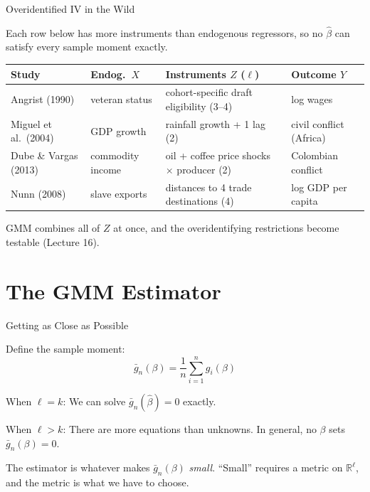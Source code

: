 \documentclass[aspectratio=169, handout, t]{beamer}
\numberwithin{equation}{section}
\begin{document}
\begin{frame}{Overidentified IV in the Wild}

Each row below has more instruments than endogenous regressors, so no $\hat\beta$ can satisfy every sample moment exactly.

\medskip
\renewcommand{\arraystretch}{1.05}
\footnotesize
\begin{tabular}{p{3.0cm}p{2.3cm}p{4.4cm}p{2.4cm}}
\toprule
\textbf{Study} & \textbf{Endog.\ $X$} & \textbf{Instruments $Z$ ($\ell$)} & \textbf{Outcome $Y$} \\
\midrule
Angrist (1990) & veteran status & cohort-specific draft eligibility (3--4) & log wages \\
Miguel et al.\ (2004) & GDP growth & rainfall growth + 1 lag (2) & civil conflict (Africa) \\
Dube \& Vargas (2013) & commodity income & oil + coffee price shocks $\times$ producer (2) & Colombian conflict \\
Nunn (2008) & slave exports & distances to 4 trade destinations (4) & log GDP per capita \\
\bottomrule
\end{tabular}
\renewcommand{\arraystretch}{1.0}
\normalsize

\smallskip
GMM combines all of $Z$ at once, and the overidentifying restrictions become testable (Lecture 16).

\end{frame}

\section{The GMM Estimator}

\begin{frame}{Getting as Close as Possible}

Define the sample moment:
$$\bar{g}_n(\beta) = \frac{1}{n}\sum_{i=1}^n g_i(\beta)$$

\smallskip
When $\ell = k$: We can solve $\bar{g}_n(\hat\beta) = 0$ exactly.

\smallskip
When $\ell > k$: There are \alert{more equations than unknowns}. In general, no $\beta$ sets $\bar{g}_n(\beta) = 0$.

\medskip
The estimator is whatever makes $\bar g_n(\beta)$ \emph{small}.  ``Small'' requires a metric on $\mathbb{R}^\ell$, and the metric is what we have to choose.

\end{frame}
\end{document}
